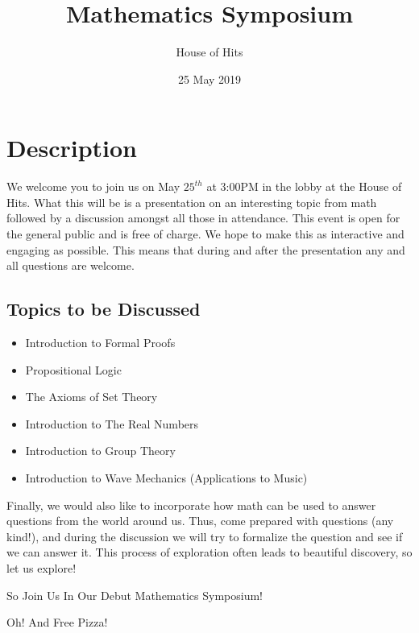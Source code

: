\documentclass[12pt]{article}
\theoremstyle{definition}
\theoremstyle{remark}
\theoremstyle{definition}
\begin{document}
\title{\textbf{Mathematics Symposium}}
\author{House of Hits}
\date{25 May 2019}
\maketitle

\section{Description}

 We welcome you to join us on May $25^{th}$ at 3:00PM in the lobby at the House of Hits. What this will be is a presentation on an interesting topic from math followed by a discussion amongst all those in attendance. This event is open for the general public and is free of charge. We hope to make this as interactive and engaging as possible. This means that during and after the presentation any and all questions are welcome. 

\subsection{Topics to be Discussed}

\begin{itemize}
    \item Introduction to Formal Proofs
    \item Propositional Logic
    \item The Axioms of Set Theory
    \item Introduction to The Real Numbers
    \item Introduction to Group Theory
    \item Introduction to Wave Mechanics (Applications to Music)
\end{itemize}

\noindent Finally, we would also like to incorporate how math can be used to answer questions from the world around us. Thus, come prepared with questions (any kind!), and during the discussion we will try to formalize the question and see if we can answer it. This process of exploration often leads to beautiful discovery, so let us explore!

\vspace{12mm}

\centerline{\Large{So Join Us In Our Debut Mathematics Symposium!}}

\vspace{10mm}

\centerline{\large{Oh! And Free Pizza!}}
\end{document}
